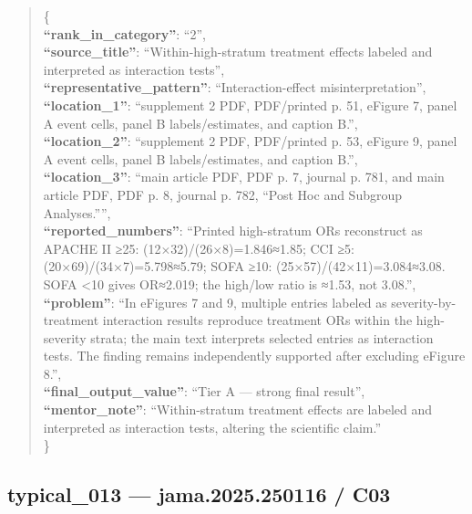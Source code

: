 \documentclass[
  letterpaper,
  9pt]{extreport}
\begin{document}
\begin{quote}
\{\\
\textbf{``rank\_in\_category''}: ``2'',\\
\textbf{``source\_title''}: ``Within-high-stratum treatment effects
labeled and interpreted as interaction tests'',\\
\textbf{``representative\_pattern''}: ``Interaction-effect
misinterpretation'',\\
\textbf{``location\_1''}: ``supplement 2 PDF, PDF/printed p. 51, eFigure
7, panel A event cells, panel B labels/estimates, and caption B.'',\\
\textbf{``location\_2''}: ``supplement 2 PDF, PDF/printed p. 53, eFigure
9, panel A event cells, panel B labels/estimates, and caption B.'',\\
\textbf{``location\_3''}: ``main article PDF, PDF p. 7, journal p. 781,
and main article PDF, PDF p. 8, journal p. 782, ``Post Hoc and Subgroup
Analyses.'''',\\
\textbf{``reported\_numbers''}: ``Printed high-stratum ORs reconstruct
as APACHE II ≥25: (12×32)/(26×8)=1.846≈1.85; CCI ≥5:
(20×69)/(34×7)=5.798≈5.79; SOFA ≥10: (25×57)/(42×11)=3.084≈3.08. SOFA
\textless10 gives OR≈2.019; the high/low ratio is ≈1.53, not 3.08.'',\\
\textbf{``problem''}: ``In eFigures 7 and 9, multiple entries labeled as
severity-by-treatment interaction results reproduce treatment ORs within
the high-severity strata; the main text interprets selected entries as
interaction tests. The finding remains independently supported after
excluding eFigure 8.'',\\
\textbf{``final\_output\_value''}: ``Tier A --- strong final result'',\\
\textbf{``mentor\_note''}: ``Within-stratum treatment effects are
labeled and interpreted as interaction tests, altering the scientific
claim.''\\
\}
\end{quote}

\hypertarget{typical_013--jama2025250116--c03}{%
\subsection{typical\_013 --- jama.2025.250116 /
C03}\label{typical_013--jama2025250116--c03}}
\end{document}
